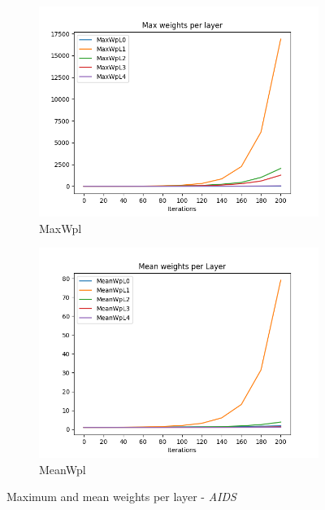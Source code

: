 		\begin{figure}[H]
			\centering	
			\begin{subfigure}{0.45\textwidth}
				\centering
				\includegraphics[width=1.1\linewidth]{images/plotA2_MaxWpL_AIDS_GDL_24_17h-05}
				\caption{MaxWpl}
				\label{fig:plota2maxwplaidsgdl2417h-05}
			\end{subfigure}
			\begin{subfigure}{0.45\textwidth}
				\centering
				\includegraphics[width=1.1\linewidth]{images/plotA2_MeanWpL_AIDS_GDL_24_17h-05}
				\caption{MeanWpl}
				\label{fig:plota2meanwplaidsgdl2417h-05}
			\end{subfigure}
			\caption{Maximum and mean weights per layer - \textit{AIDS}}
			\label{fig:MaxMeanWpL_AIDS}
		\end{figure}
		
